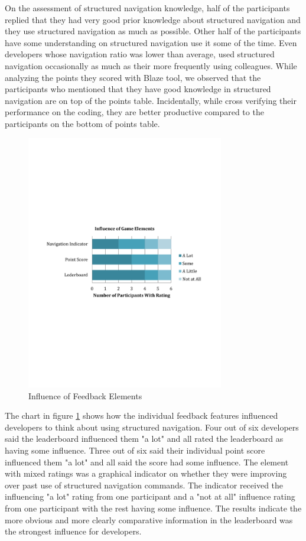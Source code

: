 \documentclass{sig-alternate}
\begin{document}
On the assessment of structured navigation knowledge, half of the participants replied that they had very good prior knowledge about structured navigation and they use structured navigation as much as possible.  Other half of the participants have some understanding on structured navigation use it some of the time. Even developers whose navigation ratio  was lower than average, used structured navigation occasionally as much as their more frequently using colleagues.  While analyzing the points they scored with Blaze tool, we observed that the participants who mentioned that they have good knowledge in structured navigation are on top of the points table. 
Incidentally, while cross verifying their performance on the coding, they are better productive compared to the participants on the bottom of points table.
\begin{figure}
	\includegraphics[width=3.4in]{ElementInfluenceChart.pdf}
	\caption{Influence of Feedback Elements}
	\label{fig:elementInfluence}
\end{figure}

The chart in figure \ref{fig:elementInfluence} shows how the individual feedback features influenced developers to think about using structured navigation.  Four out of six developers said the leaderboard influenced them "a lot" and all rated the leaderboard as having some influence.  Three out of six  said their individual point score influenced them "a lot" and all said the score had some influence.  The element with mixed ratings was a graphical indicator on whether they were improving over past use of structured navigation commands.  The indicator received the influencing "a lot" rating from one participant and a "not at all" influence rating from one participant with the rest having some influence.  The results indicate the more obvious and more clearly comparative information in the leaderboard was the strongest influence for developers.
\end{document}
